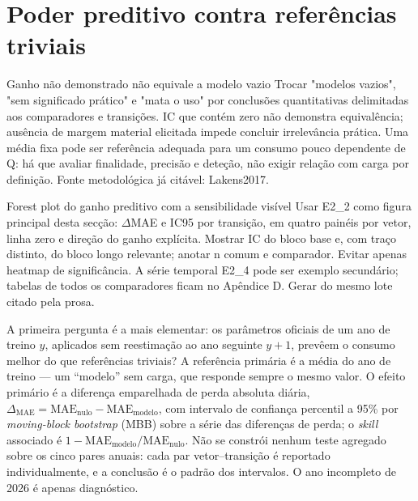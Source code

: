 \section{Poder preditivo contra referências triviais}
\label{sec:poder-preditivo}
{Ganho não demonstrado não equivale a modelo vazio}
{Trocar "modelos vazios", "sem significado prático" e "mata o uso" por
conclusões quantitativas delimitadas aos comparadores e transições.
IC que contém zero não demonstra equivalência; ausência de margem
material elicitada impede concluir irrelevância prática. Uma média fixa
pode ser referência adequada para um consumo pouco dependente de Q:
há que avaliar finalidade, precisão e deteção, não exigir relação com
carga por definição. Fonte metodológica já citável: Lakens2017.}%

{Forest plot do ganho preditivo com a sensibilidade visível}
{Usar E2\_2 como figura principal desta secção: \ensuremath{\Delta}MAE e IC95 por transição,
em quatro painéis por vetor, linha zero e direção do ganho explícita.
Mostrar IC do bloco base e, com traço distinto, do bloco longo relevante;
anotar n comum e comparador. Evitar apenas heatmap de significância.
A série temporal E2\_4 pode ser exemplo secundário; tabelas de todos os
comparadores ficam no Apêndice D. Gerar do mesmo lote citado pela prosa.}%

A primeira pergunta é a mais elementar: os parâmetros oficiais
de um ano de treino $y$, aplicados sem reestimação ao ano seguinte $y{+}1$,
prevêem o consumo melhor do que referências triviais? A referência primária é
a média do ano de treino --- um ``modelo'' sem carga, que responde sempre o
mesmo valor. O efeito primário é a diferença emparelhada de perda absoluta
diária, $\Delta_{\mathrm{MAE}} = \mathrm{MAE}_{\mathrm{nulo}} -
\mathrm{MAE}_{\mathrm{modelo}}$, com intervalo de confiança percentil a 95\%
por \emph{moving-block bootstrap} (MBB) sobre a série das diferenças de
perda; o \emph{skill} associado é
$1 - \mathrm{MAE}_{\mathrm{modelo}}/\mathrm{MAE}_{\mathrm{nulo}}$. Não se
constrói nenhum teste agregado sobre os cinco pares anuais: cada par
vetor--transição é reportado individualmente, e a conclusão é o padrão dos
intervalos. O ano incompleto de 2026 é apenas diagnóstico.

